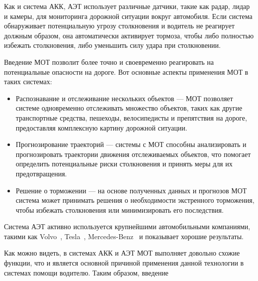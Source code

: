 Как и система АКК, АЭТ использует различные датчики, такие как радар, лидар и камеры, для мониторинга дорожной ситуации вокруг автомобиля. Если система обнаруживает потенциальную угрозу столкновения и водитель не реагирует должным образом, она автоматически активирует тормоза, чтобы либо полностью избежать столкновения, либо уменьшить силу удара при столкновении.

Введение МОТ позволит более точно и своевременно реагировать на потенциальные опасности на дороге. Вот основные аспекты применения МОТ в таких системах:

\begin{itemize}

	\item	Распознавание и отслеживание нескольких объектов --- МОТ позволяет системе одновременно отслеживать множество объектов, таких как другие транспортные средства, пешеходы, велосипедисты и препятствия на дороге, предоставляя комплексную картину дорожной ситуации.
	
	\item	Прогнозирование траекторий --- системы с МОТ способны анализировать и прогнозировать траектории движения отслеживаемых объектов, что помогает определить потенциальные риски столкновения и принять меры для их предотвращения.
	
	\item	Решение о торможении --- на основе полученных данных и прогнозов МОТ система может принимать решения о необходимости экстренного торможения, чтобы избежать столкновения или минимизировать его последствия.
	
\end{itemize}

Система АЭТ активно используется крупнейшими автомобильными компаниями, такими как Volvo~\cite{Volvo2009}, Tesla~\cite{Tesla2023}, Mercedes-Benz~\cite{MercedesBenz2021} и показывает хорошие результаты.

Как можно видеть, в системах АКК и АЭТ МОТ выполняет довольно схожие функции, что и является основной причиной применения данной технологии в системах помощи водителю. Таким образом, введение